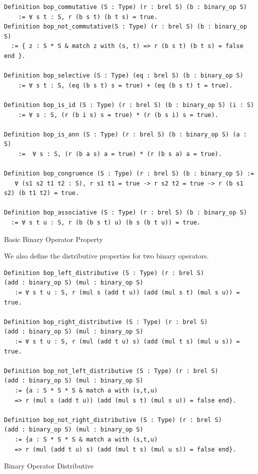 \documentclass[a4paper,12pt,twoside,openright]{report}
\begin{document}
\begin{listing}[H]
\begin{verbatim}
Definition bop_commutative (S : Type) (r : brel S) (b : binary_op S) 
    := ∀ s t : S, r (b s t) (b t s) = true. 
Definition bop_not_commutative(S : Type) (r : brel S) (b : binary_op S) 
  := { z : S * S & match z with (s, t) => r (b s t) (b t s) = false end }.
  
Definition bop_selective (S : Type) (eq : brel S) (b : binary_op S) 
    := ∀ s t : S, (eq (b s t) s = true) + (eq (b s t) t = true).
    
Definition bop_is_id (S : Type) (r : brel S) (b : binary_op S) (i : S) 
    := ∀ s : S, (r (b i s) s = true) * (r (b s i) s = true).
    
Definition bop_is_ann (S : Type) (r : brel S) (b : binary_op S) (a : S)
    :=  ∀ s : S, (r (b a s) a = true) * (r (b s a) a = true).
    
Definition bop_congruence (S : Type) (r : brel S) (b : binary_op S) := 
   ∀ (s1 s2 t1 t2 : S), r s1 t1 = true -> r s2 t2 = true -> r (b s1 s2) (b t1 t2) = true.

Definition bop_associative (S : Type) (r : brel S) (b : binary_op S) 
  := ∀ s t u : S, r (b (b s t) u) (b s (b t u)) = true.
\end{verbatim}
\caption{Basic Binary Operator Property} 
\label{coq:def:binary_properties_basic}
\end{listing}

We also define the distributive properties for two binary operators.
\begin{listing}[H]
\begin{verbatim}
Definition bop_left_distributive (S : Type) (r : brel S) 
(add : binary_op S) (mul : binary_op S) 
   := ∀ s t u : S, r (mul s (add t u)) (add (mul s t) (mul s u)) = true. 

Definition bop_right_distributive (S : Type) (r : brel S) 
(add : binary_op S) (mul : binary_op S) 
   := ∀ s t u : S, r (mul (add t u) s) (add (mul t s) (mul u s)) = true. 

Definition bop_not_left_distributive (S : Type) (r : brel S) 
(add : binary_op S) (mul : binary_op S) 
   := {a : S * S * S & match a with (s,t,u) 
   => r (mul s (add t u)) (add (mul s t) (mul s u)) = false end}. 

Definition bop_not_right_distributive (S : Type) (r : brel S) 
(add : binary_op S) (mul : binary_op S) 
   := {a : S * S * S & match a with (s,t,u) 
   => r (mul (add t u) s) (add (mul t s) (mul u s)) = false end}.
\end{verbatim}
\caption{Binary Operator Distributive} 
\label{coq:def:binary_properties_distributive}
\end{listing}
\end{document}
